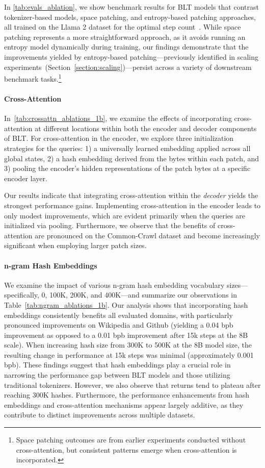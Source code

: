 In \autoref{tab:evals_ablation}, we show benchmark results for {\textsc BLT} models that contrast tokenizer-based models, space patching, and entropy-based patching approaches, all trained on the Llama 2 dataset for the optimal step count~\citep{dubey2024llama}. While space patching represents a more straightforward approach, as it avoids running an entropy model dynamically during training, our findings demonstrate that the improvements yielded by entropy-based patching—previously identified in scaling experiments~(Section~\ref{section:scaling})—persist across a variety of downstream benchmark tasks.\footnote{Space patching outcomes are from earlier experiments conducted without cross-attention, but consistent patterns emerge when cross-attention is incorporated.}

\paragraph{Cross-Attention}
In~\autoref{tab:crossattn_ablations_1b}, we examine the effects of incorporating cross-attention at different locations within both the encoder and decoder components of {\textsc BLT}. For cross-attention in the encoder, we explore three initialization strategies for the queries: 1) a universally learned embedding applied across all global states, 2) a hash embedding derived from the bytes within each patch, and 3) pooling the encoder's hidden representations of the patch bytes at a specific encoder layer.

Our results indicate that integrating cross-attention within the \textit{decoder} yields the strongest performance gains. Implementing cross-attention in the encoder leads to only modest improvements, which are evident primarily when the queries are initialized via pooling. Furthermore, we observe that the benefits of cross-attention are pronounced on the Common-Crawl dataset and become increasingly significant when employing larger patch sizes.

\paragraph{n-gram Hash Embeddings} 

We examine the impact of various n-gram hash embedding vocabulary sizes—specifically, 0, 100K, 200K, and 400K—and summarize our observations in Table~\ref{tab:ngram_ablations_1b}. Our analysis shows that incorporating hash embeddings consistently benefits all evaluated domains, with particularly pronounced improvements on Wikipedia and Github (yielding a 0.04 bpb improvement as opposed to a 0.01 bpb improvement after 15k steps at the 8B scale). When increasing hash size from 300K to 500K at the 8B model size, the resulting change in performance at 15k steps was minimal (approximately 0.001 bpb). These findings suggest that hash embeddings play a crucial role in narrowing the performance gap between {\textsc BLT} models and those utilizing traditional tokenizers. However, we also observe that returns tend to plateau after reaching 300K hashes. Furthermore, the performance enhancements from hash embeddings and cross-attention mechanisms appear largely additive, as they contribute to distinct improvements across multiple datasets.

